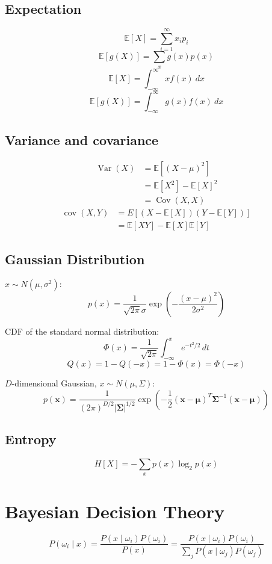 \documentclass{report}
\begin{document}
\section*{Expectation}
\[\mathbb{E}[X] = \sum_{i=1}^\infty x_i p_i\]
\[\mathbb{E}[g(X)] = \sum_{x} g(x) p(x)\]
\[\mathbb{E}[X] = \int_{-\infty}^\infty x f(x)\ dx\]
\[\mathbb{E}[g(X)] = \int_{-\infty}^\infty g(x) f(x)\ dx\]

\section*{Variance and covariance}
\[\begin{split}
	\operatorname{Var}(X) &= \mathbb{E}[(X - \mu)^2] \\
	&= \mathbb{E}[X^2] - \mathbb{E}[X]^2 \\
	&= \operatorname{Cov}(X, X)
\end{split}\]
\[\begin{split}
	\operatorname{cov}(X, Y) &= E{\left[(X - \mathbb{E}[X])(Y - \mathbb{E}[Y])\right]} \\
	&= \mathbb{E}[X Y] - \mathbb{E}[X] \mathbb{E}[Y]
\end{split}\]

\section*{Gaussian Distribution}
$x \sim N(\mu, \sigma^2)$:
\[p(x) = \frac{1}{\sqrt{2 \pi} \sigma} \exp\left(-\frac{(x-\mu)^2}{2\sigma^2}\right)\]

CDF of the standard normal distribution:
\[\Phi(x) = \frac{1}{\sqrt{2\pi}} \int_{-\infty}^x e^{-t^2/2} \, dt\]
\[Q(x) = 1 - Q(-x) = 1 - \Phi(x) = \Phi(-x)\]

$D$-dimensional Gaussian, $x \sim N(\mu, \Sigma)$:
\[p(\symbf{x}) = \frac{1}{(2 \pi)^{D/2} |\symbf{\Sigma}|^{1/2}} \exp\left(-\frac{1}{2}(\symbf{x}-\symbf{\mu})^T \symbf{\Sigma}^{-1} (\symbf{x}-\symbf{\mu}) \right)\]

\section*{Entropy}
\[H[X] = - \sum_x p(x) \log_2 p(x)\]


\chapter{Bayesian Decision Theory}

\[P(\omega_i \mid x) = \frac{P(x \mid \omega_i) P(\omega_i)}{P(x)} = \frac{P(x \mid \omega_i) P(\omega_i)}{\sum\limits_j P(x \mid \omega_j) P(\omega_j)}\]
\end{document}
